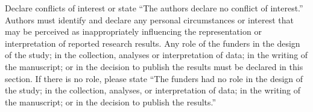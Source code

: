 \documentclass[default]{subfiles}
\begin{document}
{\begin{conflictsofinterest}
  Declare conflicts of interest or state ``The authors declare no conflict of interest.'' Authors must identify and declare any personal circumstances or interest that may be perceived as inappropriately influencing the representation or interpretation of reported research results. Any role of the funders in the design of the study; in the collection, analyses or interpretation of data; in the writing of the manuscript; or in the decision to publish the results must be declared in this section. If there is no role, please state ``The funders had no role in the design of the study; in the collection, analyses, or interpretation of data; in the writing of the manuscript; or in the decision to publish the results.''
\end{conflictsofinterest}


\putbib[cite]

\makealttitle

} %
\end{document}

